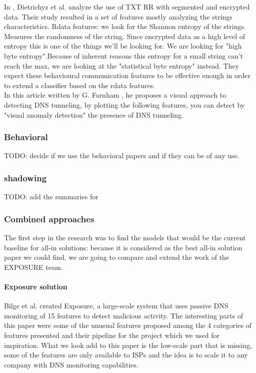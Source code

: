 In \cite{tunn1}, Dietrichyz et al. analyze the use of TXT RR with segmented and encrypted data. Their study resulted in a set of features mostly analyzing the strings characteristics.
Rdata features: we look for the Shannon entropy of the strings. Measures the randomness of the string. Since encrypted data as a high level of entropy this is one of the things we'll be looking for. We are looking for "high byte entropy".Because of inherent reasons this entropy for a small string can't reach the max, we are looking at the "statistical byte entropy" instead.
They expect these behavioural communication features to be effective enough in order to extend a classifier based on the rdata features.\\

In this article written by G. Farnham \cite{tunn}, he proposes a visual approach to detecting DNS tunneling, by plotting the following features, you can detect by "visual anomaly detection" the presence of DNS tunneling. 

\cite{dns-tun}


\subsubsection{Behavioral}
TODO: decide if we use the behavioral papers and if they can be of any use.


\subsubsection{shadowing}
TODO: add the summaries for 


\subsubsection{Combined approaches}
The first step in the research was to find the models that would be the current baseline for all-in solutions: because it is considered as the best all-in solution paper we could find, we are going to compare and extend the work of the EXPOSURE team.

\paragraph{Exposure solution}
Bilge et al. \cite{exposure} created Exposure, a large-scale system that uses passive DNS monitoring of 15 features to detect malicious activity. The interesting parts of this paper were some of the unusual features proposed among the 4 categories of features presented and their pipeline for the project which we used for inspiration. What we look add to this paper is the low-scale part that is missing, some of the features are only available to ISPs and the idea is to scale it to any company with DNS monitoring capabilities.

